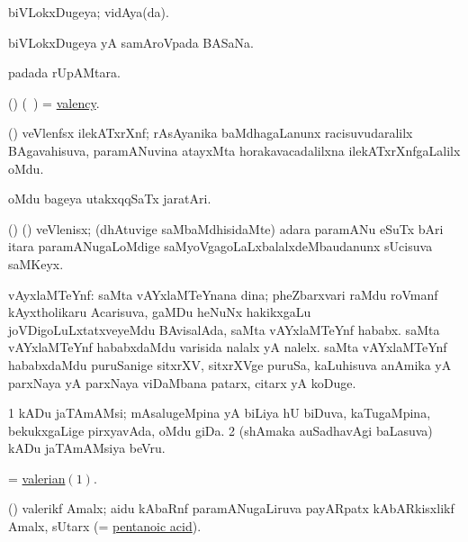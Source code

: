 \bentry 
{} 
\gl{\gu}
\expl{}
\bmng
 biVLokxDugeya; vidAya(da). 
\emng
\eentry

\bentry
{} 
\gl{\nA}
\bmng
 biVLokxDugeya yA samAroVpada BASaNa. 
\emng
\eentry

\bentry
{} 
\gl{\nA}
\expl{}
\bmng
  padada rUpAMtara. 
\emng
\eentry

\bentry
{} 
\gl{\nA}
\expl{}
\bmng
 (\ravi) (\kanmu\ \ame) = \hyperlink{valency}{valency}. 
\emng
\eentry

\bentry 
{}
\gl{\nA}
\expl{}
\bmng
 (\ravi) veVlenfsx ilekATxrXnf; rAsAyanika baMdhagaLanunx racisuvudaralilx BAgavahisuva, paramANuvina atayxMta horakavacadalilxna ilekATxrXnfgaLalilx oMdu. 
\emng
\eentry

\bentry
{} 
\gl{\nA}
\expl{}
\bmng
oMdu bageya utakxqqSaTx jaratAri. 
\emng
\eentry

\bentry
{} 
\gl{\nA}
\bmng
 (\birx) (\ravi) veVlenisx; (dhAtuvige saMbaMdhisidaMte) adara paramANu eSuTx bAri itara paramANugaLoMdige saMyoVgagoLaLxbalalxdeMbaudanunx sUcisuva saMKeyx. 
\emng
\eentry

\bentry
{} 
\gl{\nA}
\expl{}
\bmng
 vAyxlaMTeYnf: 
\banum
{} saMta vAYxlaMTeYnana dina; pheZbarxvari raMdu roVmanf kAyxtholikaru Acarisuva, gaMDu heNuNx hakikxgaLu joVDigoLuLxtatxveyeMdu BAvisalAda, saMta vAYxlaMTeYnf hababx. 
 saMta vAYxlaMTeYnf hababxdaMdu varisida nalalx yA nalelx. 
 saMta vAYxlaMTeYnf hababxdaMdu puruSanige sitxrXV, sitxrXVge puruSa, kaLuhisuva anAmika yA parxNaya yA parxNaya viDaMbana patarx, citarx yA koDuge. 
\eanum
\emng
\eentry

\bentry
{} 
\gl{\nA}
\expl{}
\bmng
\bnum
\num{1} kADu jaTAmAMsi; mAsalugeMpina yA biLiya hU biDuva, kaTugaMpina, bekukxgaLige pirxyavAda, oMdu giDa. 
\num{2} (shAmaka auSadhavAgi baLasuva) kADu jaTAmAMsiya beVru. 
\enum
\emng

\noindent
\gl{\pagu}
\bmng
{} = \hyperlink{valerian}{valerian\((1)\)}. 
\emng
\eentry


\bentry
{} 
\gl{\nA}
\expl{}
\bmng
 (\ravi) valerikf Amalx; aidu kAbaRnf paramANugaLiruva payARpatx kAbARkisxlikf Amalx, sUtarx  (= \hyperref{kandict_p.pdf}{P}{pentanoic acid}{pentanoic acid}). 
\emng
\eentry

